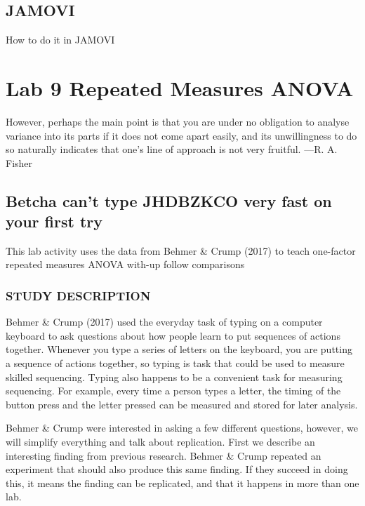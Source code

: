 \documentclass[]{book}
\begin{document}
\section{JAMOVI}\label{jamovi-8}

How to do it in JAMOVI

\chapter{Lab 9 Repeated Measures
ANOVA}\label{lab-9-repeated-measures-anova}

{ However, perhaps the main point is that you are under no obligation to
analyse variance into its parts if it does not come apart easily, and
its unwillingness to do so naturally indicates that one's line of
approach is not very fruitful. ---R. A. Fisher }

\section{Betcha can't type JHDBZKCO very fast on your first
try}\label{betcha-cant-type-jhdbzkco-very-fast-on-your-first-try}

This lab activity uses the data from Behmer \& Crump (2017) to teach
one-factor repeated measures ANOVA with-up follow comparisons

\subsection{STUDY DESCRIPTION}\label{study-description-3}

Behmer \& Crump (2017) used the everyday task of typing on a computer
keyboard to ask questions about how people learn to put sequences of
actions together. Whenever you type a series of letters on the keyboard,
you are putting a sequence of actions together, so typing is task that
could be used to measure skilled sequencing. Typing also happens to be a
convenient task for measuring sequencing. For example, every time a
person types a letter, the timing of the button press and the letter
pressed can be measured and stored for later analysis.

Behmer \& Crump were interested in asking a few different questions,
however, we will simplify everything and talk about replication. First
we describe an interesting finding from previous research. Behmer \&
Crump repeated an experiment that should also produce this same finding.
If they succeed in doing this, it means the finding can be replicated,
and that it happens in more than one lab.
\end{document}
